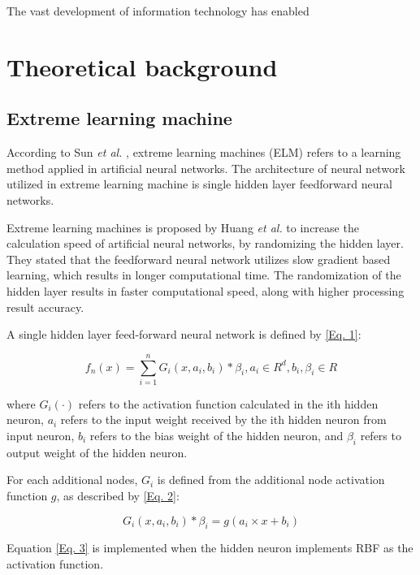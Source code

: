 \documentclass[journal,comsoc]{IEEEtran}
\begin{document}
The vast development of information technology has enabled 

\section{Theoretical background}


\subsection{Extreme learning machine}

According to Sun \textit{et al.} \cite{Gao14}, extreme learning machines (ELM) refers to a learning method applied in artificial neural networks. The architecture of neural network utilized in extreme learning machine is single hidden layer feedforward neural networks.

Extreme learning machines is proposed by Huang \textit{et al.} \cite{Huang06} to increase the calculation speed of artificial neural networks, by randomizing the hidden layer. They stated that the feedforward neural network utilizes slow gradient based learning, which results in longer computational time. The randomization of the hidden layer results in faster computational speed, along with higher processing result accuracy.

A single hidden layer feed-forward neural network is defined by \eqref{Eq. 1}:

\begin{equation}
f_{n} (x) = \sum_{i=1}^{n} G_{i} (x, a_{i}, b_{i}) * \beta_{i}, a_{i} \in R^d, b_{i}, \beta_{i} \in R\label{Eq. 1}
\end{equation}

where $G_{i}(\cdot)$ refers to the activation function calculated in the ith hidden neuron, $a_{i}$ refers to the input weight received by the ith hidden neuron from input neuron, $b_{i}$ refers to the bias weight of the hidden neuron, and $\beta_{i}$ refers to output weight of the hidden neuron.

For each additional nodes, $G_{i}$ is defined from the additional node activation function $g$, as described by \eqref{Eq. 2}:

\begin{equation}
G_{i} (x, a_{i}, b_{i}) * \beta_{i} = g(a_{i} \times x + b_{i})\label{Eq. 2}
\end{equation}

Equation \eqref{Eq. 3} is implemented when the hidden neuron implements RBF as the activation function.
\end{document}
